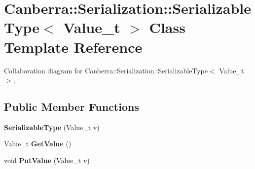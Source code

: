 \hypertarget{class_canberra_1_1_serialization_1_1_serializable_type}{}\section{Canberra\+:\+:Serialization\+:\+:Serializable\+Type$<$ Value\+\_\+t $>$ Class Template Reference}
\label{class_canberra_1_1_serialization_1_1_serializable_type}


Collaboration diagram for Canberra\+:\+:Serialization\+:\+:Serializable\+Type$<$ Value\+\_\+t $>$\+:
\subsection*{Public Member Functions}
\begin{DoxyCompactItemize}
\item 
\mbox{\label{class_canberra_1_1_serialization_1_1_serializable_type_a77b06bac8adcb7a348b1966a4e43a5eb}} 
{\bfseries Serializable\+Type} (Value\+\_\+t v)
\item 
\mbox{\label{class_canberra_1_1_serialization_1_1_serializable_type_a7829e73ce6f69c88535c6be96645223b}} 
Value\+\_\+t {\bfseries Get\+Value} ()
\item 
\mbox{\label{class_canberra_1_1_serialization_1_1_serializable_type_ad87817fb182724675c1deeaf9fb31743}} 
void {\bfseries Put\+Value} (Value\+\_\+t v)
\end{DoxyCompactItemize}
